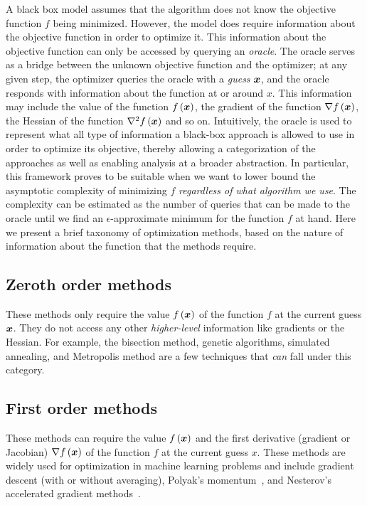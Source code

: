 \documentclass{article}
\begin{document}
A black box model assumes that the algorithm does not know the objective function $f$ being minimized.
However, the model does require information about the objective function in order to optimize it.
This information about the objective function can only be accessed by querying an \emph{oracle}. 
The oracle serves as a bridge between the unknown objective function and the optimizer; at any given step, the optimizer queries the oracle with a \emph{guess} ${\bm{x}}$, and the oracle responds with information about the function at or around $x$.
This information may include the value of the function $f\left({\bm{x}}\right)$, the gradient of the function $\nabla f\left({\bm{x}}\right)$, the Hessian of the function $\nabla^2 f\left({\bm{x}}\right)$ and so on.
Intuitively, the oracle is used to represent what all type of information a black-box approach is allowed to use in order to optimize its objective, thereby allowing a categorization of the approaches as well as enabling analysis at a broader abstraction.
In particular, this framework proves to be suitable when we want to lower bound the asymptotic complexity of minimizing $f$ {\em regardless of what algorithm we use}. 
The complexity can be estimated as the number of queries that can be made to the oracle until we find an $\epsilon$-approximate minimum for the function $f$ at hand. 
Here we present a brief taxonomy of optimization methods, based on the nature of information about the function that the methods require.
 
\subsection{Zeroth order methods} 
These methods only require the value $f\left({\bm{x}}\right)$ of the function $f$ at the current guess ${\bm{x}}$. 
They do not access any other \emph{higher-level} information like gradients or the Hessian. 
For example, the bisection method, genetic algorithms, simulated annealing, and Metropolis method are a few techniques that {\em can} fall under this category.

\subsection{First order methods} 
These methods can require the value $f\left({\bm{x}}\right)$ and the first derivative (gradient or Jacobian) $\nabla f\left({\bm{x}}\right)$ of the function $f$ at the current guess $x$. 
These methods are widely used for optimization in machine learning problems and include gradient descent (with or without averaging), Polyak's momentum~\cite{polyak}, and Nesterov's accelerated gradient methods~\cite{nesterov}.
\end{document}

